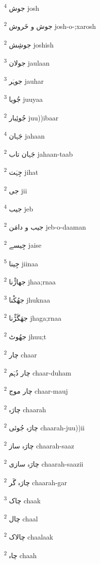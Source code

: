 \documentclass[12pt]{article}
\begin{document}
\begin{multicols}{5}
{\ur جوش}   \textsuperscript{4} josh

{\ur جوش و خَروش}   \textsuperscript{2} josh-o-;xarosh

{\ur جوشِش}   \textsuperscript{2} joshish

{\ur جولان}   \textsuperscript{3} jaulaan

{\ur جوہَر}   \textsuperscript{3} jauhar

{\ur جُویا}   \textsuperscript{3} juuyaa

{\ur جُوئِبار}   \textsuperscript{2} juu))ibaar

{\ur جَہان}   \textsuperscript{4} jahaan

{\ur جَہان تاب}   \textsuperscript{2} jahaan-taab

{\ur جِہَت}   \textsuperscript{2} jihat

{\ur جی}   \textsuperscript{2} jii

{\ur جیب}   \textsuperscript{4} jeb

{\ur جیب و دامَن}   \textsuperscript{2} jeb-o-daaman

{\ur جِیسے}   \textsuperscript{2} jaise

{\ur جِینا}   \textsuperscript{5} jiinaa

{\ur جھاڑْنا}   \textsuperscript{2} jhaa;rnaa

{\ur جھُکْنا}   \textsuperscript{3} jhuknaa

{\ur جھَگَڑْنا}   \textsuperscript{2} jhaga;rnaa

{\ur جھُوٹ}   \textsuperscript{2} jhuu;t

{\ur چار}   \textsuperscript{2} chaar

{\ur چار دُہَم}   \textsuperscript{2} chaar-duham

{\ur چار موج}   \textsuperscript{2} chaar-mauj

{\ur چارَہ}   \textsuperscript{2} chaarah

{\ur چارَہ جُوئی}   \textsuperscript{2} chaarah-juu))ii

{\ur چارَہ ساز}   \textsuperscript{2} chaarah-saaz

{\ur چارَہ سازی}   \textsuperscript{2} chaarah-saazii

{\ur چارَہ گَر}   \textsuperscript{2} chaarah-gar

{\ur چاک}   \textsuperscript{3} chaak

{\ur چال}   \textsuperscript{2} chaal

{\ur چالاک}   \textsuperscript{2} chaalaak

{\ur چاہ}   \textsuperscript{2} chaah


\end{multicols}
\end{document}
